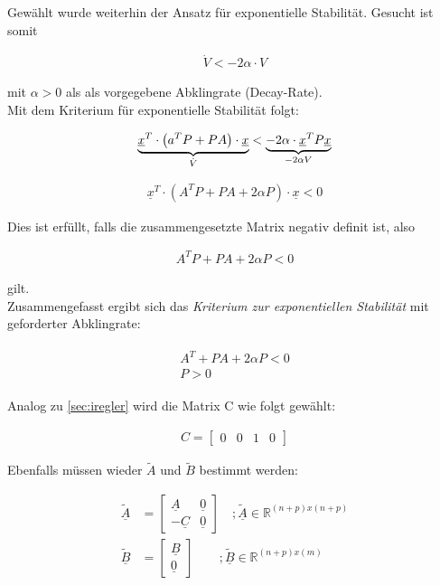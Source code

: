 Gewählt wurde weiterhin der Ansatz für exponentielle Stabilität. Gesucht ist somit

\begin{align}
    \dot{V} < -2\alpha \cdot V
\end{align}

mit $\alpha > 0$ als als vorgegebene Abklingrate (Decay-Rate).\\
\newline
Mit dem Kriterium für exponentielle Stabilität folgt:

\[
    \underbrace{%
        \underline{x}^T \cdot \left( a^TP + PA\right) \cdot \underline{x}
    }_{%
    \dot{V}
    }
    < 
    \underbrace{%
    -2\alpha \cdot \underline{x}^TP\underline{x}
    }_{%
    -2\alpha V
    }
\]

\begin{align}
    \underline{x}^T \cdot \left( A^TP + PA + 2\alpha P\right) \cdot \underline{x} < 0
\end{align}

Dies ist erfüllt, falls die zusammengesetzte Matrix negativ definit ist, also 

\begin{align}
    A^TP + PA + 2\alpha P < 0
\end{align}

gilt.\\
\newline
Zusammengefasst ergibt sich das \textit{Kriterium zur exponentiellen Stabilität} mit geforderter Abklingrate:

\begin{align} \label{eq:Gleichung82}
    \begin{split}
        A^T + PA + 2\alpha P < 0 \\
        P > 0
    \end{split}
\end{align}

Analog zu \autoref{sec:iregler} wird die Matrix C wie folgt gewählt:

\begin{align*}
    C = 
    \begin{bmatrix}
        0 & 0 & 1 & 0
    \end{bmatrix}
\end{align*}

Ebenfalls müssen wieder $\tilde{A}$ und $\tilde{B}$ bestimmt werden:

\begin{align*}
    \underline{\tilde{A}} &= 
    \begin{bmatrix}
        \underline{A} & \underline{0} \\
        -\underline{C} & \underline{0}
    \end{bmatrix} \quad ; \underline{\tilde{A}}\in\mathbb{R}^{(n+p)x(n+p)}\\
    \underline{\tilde{B}} &= 
    \begin{bmatrix}
        \underline{B} \\
        \underline{0}
    \end{bmatrix}\qquad ; \underline{\tilde{B}}\in\mathbb{R}^{(n+p)x(m)}
\end{align*}

